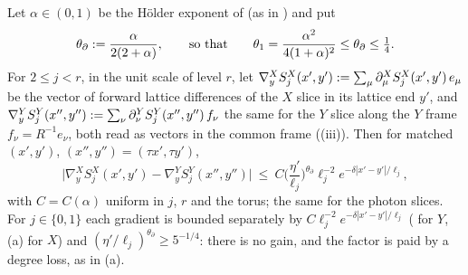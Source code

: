 
\begin{lemma}\label{rot:hyb:lem:DS}
Let $\alpha\in(0,1)$ be the H\"older exponent of \cite[(3.8)]{K1} (as in ) and put
\[
\theta_\partial:=\frac{\alpha}{2(2+\alpha)},\qquad\text{so that}\qquad\theta_1=\frac{\alpha^2}{4(1+\alpha)^2}\le\theta_\partial\le\tfrac14 .
\]
For $2\le j<r$, in the unit scale of level $r$, let $\nabla^X_yS^X_j(x',y'):=\sum_\mu\partial^X_\mu S^X_j(x',y')\,e_\mu$ be the vector of forward lattice differences of the $X$ slice in its lattice end $y'$, and $\nabla^Y_yS^Y_j(x'',y''):=\sum_\nu\partial^Y_\nu S^Y_j(x'',y'')\,f_\nu$ the same for the $Y$ slice along the $Y$ frame $f_\nu=R^{-1}e_\nu$, both read as vectors in the common frame ((iii)). Then for matched $(x',y')$, $(x'',y'')=(\tau x',\tau y')$,
\[
\big|\nabla^X_yS^X_j(x',y')-\nabla^Y_yS^Y_j(x'',y'')\big|\ \le\ C\Big(\frac{\eta'}{\ell_j}\Big)^{\theta_\partial}\ell_j^{-2}e^{-\delta|x'-y'|/\ell_j},
\]
with $C=C(\alpha)$ uniform in $j$, $r$ and the torus; the same for the photon slices. For $j\in\{0,1\}$ each gradient is bounded separately by $C\ell_j^{-2}e^{-\delta|x'-y'|/\ell_j}$ (\cite[(3.63)]{K1} for $Y$, (a) for $X$) and $(\eta'/\ell_j)^{\theta_\partial}\ge5^{-1/4}$: there is no gain, and the factor is paid by a degree loss, as in (a).
\end{lemma}

